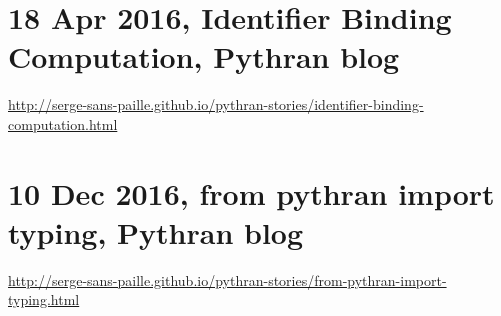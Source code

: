 \documentclass{deliverablereport}
\author{Serge Guelton}
\begin{document}
\maketitle
\githubissuedescription
\tableofcontents\newpage

\clearpage
\appendix
\section{18 Apr 2016, Identifier Binding Computation, Pythran blog}

{\scriptsize \url{http://serge-sans-paille.github.io/pythran-stories/identifier-binding-computation.html}}

\bigskip



\clearpage

\section{10 Dec 2016, from pythran import typing, Pythran blog}

{\scriptsize \url{http://serge-sans-paille.github.io/pythran-stories/from-pythran-import-typing.html}}

\medskip


\end{document}
